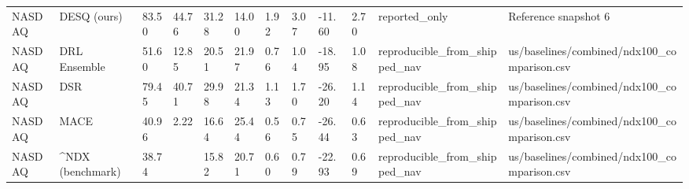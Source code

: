 \begin{landscape}
\begin{longtable}{llllllllllll}
NASDAQ & DESQ (ours) & 83.50 & 44.76 & 31.28 & 14.00 & 1.92 & 3.07 & -11.60 & 2.70 & reported\_only & Reference snapshot 6 \\
NASDAQ & DRL Ensemble & 51.60 & 12.85 & 20.51 & 21.97 & 0.76 & 1.04 & -18.95 & 1.08 & reproducible\_from\_shipped\_nav & us/baselines/combined/ndx100\_comparison.csv \\
NASDAQ & DSR & 79.45 & 40.71 & 29.98 & 21.34 & 1.13 & 1.70 & -26.20 & 1.14 & reproducible\_from\_shipped\_nav & us/baselines/combined/ndx100\_comparison.csv \\
NASDAQ & MACE & 40.96 & 2.22 & 16.64 & 25.44 & 0.56 & 0.75 & -26.44 & 0.63 & reproducible\_from\_shipped\_nav & us/baselines/combined/ndx100\_comparison.csv \\
NASDAQ & ^NDX (benchmark) & 38.74 &  & 15.82 & 20.71 & 0.60 & 0.79 & -22.93 & 0.69 & reproducible\_from\_shipped\_nav & us/baselines/combined/ndx100\_comparison.csv \\
\bottomrule
\end{longtable}
\end{landscape}
